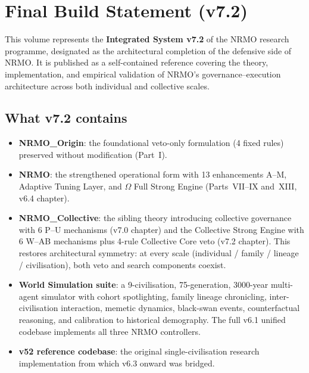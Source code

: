 \chapter*{Final Build Statement (v7.2)}


\noindent
This volume represents the \textbf{Integrated System v7.2} of the NRMO
research programme, designated as the architectural completion of the
defensive side of NRMO. It is published as a self-contained reference
covering the theory, implementation, and empirical validation of NRMO's
governance--execution architecture across both individual and collective
scales.

\section*{What v7.2 contains}

\begin{itemize}
\item \textbf{NRMO\_Origin}: the foundational veto-only formulation
  (4 fixed rules) preserved without modification (Part~I).
\item \textbf{NRMO}: the strengthened operational form with 13 enhancements
  A--M, Adaptive Tuning Layer, and $\Omega$ Full Strong Engine (Parts~VII--IX
  and~XIII, v6.4 chapter).
\item \textbf{NRMO\_Collective}: the sibling theory introducing collective
  governance with 6 P--U mechanisms (v7.0 chapter) and the
  Collective Strong Engine with 6 W--AB mechanisms plus 4-rule Collective
  Core veto (v7.2 chapter). This restores architectural symmetry: at
  every scale (individual / family / lineage / civilisation), both veto
  and search components coexist.
\item \textbf{World Simulation suite}: a 9-civilisation, 75-generation,
  3000-year multi-agent simulator with cohort spotlighting, family
  lineage chronicling, inter-civilisation interaction, memetic dynamics,
  black-swan events, counterfactual reasoning, and calibration to
  historical demography. The full v6.1 unified codebase implements
  all three NRMO controllers.
\item \textbf{v52 reference codebase}: the original single-civilisation
  research implementation from which v6.3 onward was bridged.
\end{itemize}


